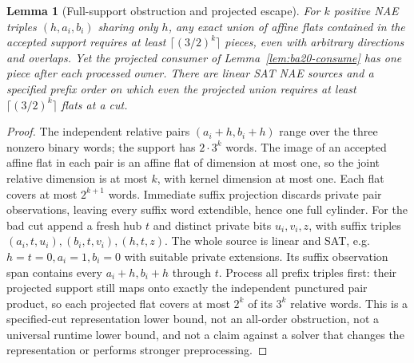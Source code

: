 \documentclass[11pt]{article}
\newtheorem{lemma}[theorem]{Lemma}
\begin{document}
\begin{lemma}[Full-support obstruction and projected escape]\label{lem:ba20-star}
For $k$ positive NAE triples $(h,a_i,b_i)$ sharing only $h$, any exact union of affine flats contained in the accepted support requires at least $\lceil(3/2)^k\rceil$ pieces, even with arbitrary directions and overlaps. Yet the projected consumer of Lemma~\ref{lem:ba20-consume} has one piece after each processed owner. There are linear SAT NAE sources and a specified prefix order on which even the projected union requires at least $\lceil(3/2)^k\rceil$ flats at a cut.
\end{lemma}
\begin{proof}
The independent relative pairs $(a_i+h,b_i+h)$ range over the three nonzero binary words; the support has $2\cdot3^k$ words. The image of an accepted affine flat in each pair is an affine flat of dimension at most one, so the joint relative dimension is at most $k$, with kernel dimension at most one. Each flat covers at most $2^{k+1}$ words. Immediate suffix projection discards private pair observations, leaving every suffix word extendible, hence one full cylinder. For the bad cut append a fresh hub $t$ and distinct private bits $u_i,v_i,z$, with suffix triples $(a_i,t,u_i),(b_i,t,v_i),(h,t,z)$. The whole source is linear and SAT, e.g. $h=t=0,a_i=1,b_i=0$ with suitable private extensions. Its suffix observation span contains every $a_i+h,b_i+h$ through $t$. Process all prefix triples first: their projected support still maps onto exactly the independent punctured pair product, so each projected flat covers at most $2^k$ of its $3^k$ relative words. This is a specified-cut representation lower bound, not an all-order obstruction, not a universal runtime lower bound, and not a claim against a solver that changes the representation or performs stronger preprocessing.
\end{proof}
\end{document}
